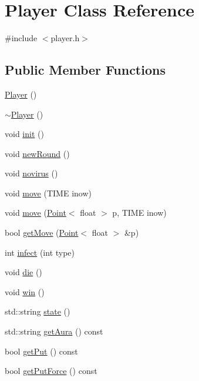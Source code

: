 \hypertarget{class_player}{\section{Player Class Reference}
\label{class_player}
}


{\ttfamily \#include $<$player.\-h$>$}

\subsection*{Public Member Functions}
\begin{DoxyCompactItemize}
\item 
\hyperlink{class_player_affe0cc3cb714f6deb4e62f0c0d3f1fd8}{Player} ()
\item 
\hyperlink{class_player_a749d2c00e1fe0f5c2746f7505a58c062}{$\sim$\-Player} ()
\item 
void \hyperlink{class_player_a015ea21fa1e7273e47d48cb20d9b12e3}{init} ()
\item 
void \hyperlink{class_player_ac9fcb79ecfc70a168f1bb906f2fe0877}{new\-Round} ()
\item 
void \hyperlink{class_player_ae9b137fafb1897951e079b5fd373d2f9}{novirus} ()
\item 
void \hyperlink{class_player_aa7f367a180d810ca39375a22fbaba45e}{move} (T\-I\-M\-E inow)
\item 
void \hyperlink{class_player_ab0f0baae5dabefc1022f7d5eec563aaa}{move} (\hyperlink{class_point}{Point}$<$ float $>$ p, T\-I\-M\-E inow)
\item 
bool \hyperlink{class_player_a993141b4f86b25982389ae524bffc915}{get\-Move} (\hyperlink{class_point}{Point}$<$ float $>$ \&p)
\item 
int \hyperlink{class_player_a865d5ca25d1d90a9b046507a0bd63dec}{infect} (int type)
\item 
void \hyperlink{class_player_a1e4b3e6ef91fc400ff2c6c26b1370f8c}{die} ()
\item 
void \hyperlink{class_player_a5d5f04fda1a8534138cd75077192c648}{win} ()
\item 
std\-::string \hyperlink{class_player_a316c65f3722a618f53139beb1248ea8f}{state} ()
\item 
std\-::string \hyperlink{class_player_a0194487be45d72dd9601a02f70a2454b}{get\-Aura} () const 
\item 
bool \hyperlink{class_player_a811626a8360d14d19f6e5e59c4b7f2ad}{get\-Put} () const 
\item 
bool \hyperlink{class_player_aeeda5dfdf5c3c53f3e09515fbf8e04cb}{get\-Put\-Force} () const 

\end{DoxyCompactItemize}
